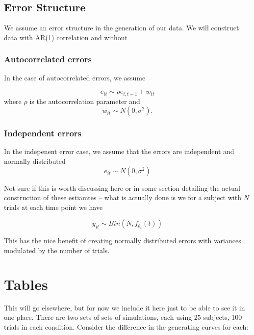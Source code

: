 \documentclass{article}
\begin{document}
\subsection{Error Structure}

We assume an error structure in the generation of our data. We will construct data with AR(1) correlation and without

\subsubsection{Autocorrelated errors}

In the case of autocorrelated errors, we assume

\begin{equation}
e_{it} \sim \rho e_{i, t-1} + w_{it}
\end{equation}
where $\rho$ is the autocorrelation parameter and
\begin{equation}
w_{it} \sim N(0, \sigma^2).
\end{equation}

\subsubsection{Independent errors}

In the indepenent error case, we assume that the errors are independent and normally distributed
\begin{equation}
e_{it} \sim N(0, \sigma^2)
\end{equation}

Not sure if this is worth discussing here or in some section detailing the actual construction of these estiamtes -- what is actually done is we for a subject with $N$ trials at each time point we have

\begin{equation}
y_{it} \sim Bin(N, f_{\theta_t}(t))
\end{equation}

This has the nice benefit of creating normally distributed errors with variances modulated by the number of trials.

\section{Tables}

This will go elsewhere, but for now we include it here just to be able to see it in one place. There are two sets of sets of simulations, each using 25 subjects, 100 trials in each condition. Consider the difference in the generating curves for each:
\end{document}
